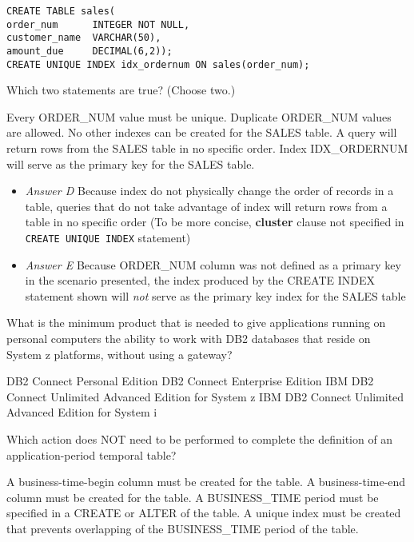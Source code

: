 \documentclass[answers, 11pt]{exam}
\begin{document}
\begin{questions}
\begin{verbatim}
CREATE TABLE sales(
order_num      INTEGER NOT NULL,
customer_name  VARCHAR(50),
amount_due     DECIMAL(6,2));
CREATE UNIQUE INDEX idx_ordernum ON sales(order_num);
\end{verbatim}
{\color{red}Which two statements are true? (Choose two.)}
\begin{choices}
	\CorrectChoice Every ORDER\_NUM value must be unique.
	\choice Duplicate ORDER\_NUM values are allowed.
	\choice No other indexes can be created for the SALES table.
	\CorrectChoice A query will return rows from the SALES table in no specific order.
	\choice Index IDX\_ORDERNUM will serve as the primary key for the SALES table.
\end{choices}

\begin{solution}
	\begin{itemize}
		\item \textit{Answer D} Because index do not physically change the order of records in a table, queries that do not take advantage of index
		will return rows from a table in no specific order (To be more concise, \textbf{cluster} clause not specified in \texttt{CREATE UNIQUE INDEX} statement)
		\item \textit{Answer E} Because ORDER\_NUM column was not defined as a primary key in the scenario presented, the index produced by the CREATE INDEX
		statement shown will \textit{not} serve as the primary key index for the SALES table
	\end{itemize}
\end{solution}

\question[1]
What is the minimum product that is needed to give applications running on personal computers the 
ability to work with DB2 databases that reside on System z platforms, without using a gateway?
\begin{choices}
	\CorrectChoice DB2 Connect Personal Edition
	\choice DB2 Connect Enterprise Edition
	\choice IBM DB2 Connect Unlimited Advanced Edition for System z
	\choice IBM DB2 Connect Unlimited Advanced Edition for System i
\end{choices}

\newpage
\question[1]
Which action does NOT need to be performed to complete the definition of an application-period temporal
table?
\begin{choices}
	\choice A business-time-begin column must be created for the table.
	\choice A business-time-end column must be created for the table.
	\choice A BUSINESS\_TIME period must be specified in a CREATE or ALTER of the table.
	\CorrectChoice A unique index must be created that prevents overlapping of the BUSINESS\_TIME period of the 
	table.
\end{choices}


\end{questions}
\end{document}
